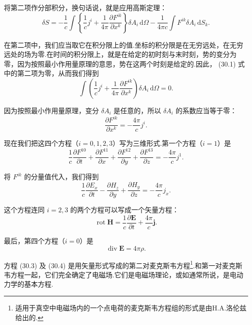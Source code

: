 将第二项作分部积分，换句话说，就是应用高斯定理：
\begin{equation}
  \delta S=-\frac{1}{c}\int\left\{\frac{1}{c}j^i
  +\frac{1}{4\pi}\frac{\partial F^{ik}}{\partial x^k}\right\}\delta A_i\,\mathrm{d}\varOmega
  -\frac{1}{4\pi c}\int F^{ik}\delta A_i\,\mathrm{d}S_k.
\end{equation}

在第二项中，我们应当取它在积分限上的值.坐标的积分限是在无穷远处，在无穷远处的场为零.在时间的积分限上，就是在给定的初时刻与末时刻，势的变分为零，因为按照最小作用量原理的意思，势在这两个时刻是给定的.因此，
(30.1) 式中的第二项为零，从而我们得到
\begin{equation*}
  \int\left(\frac{1}{c}j^i
  +\frac{1}{4\pi}\frac{\partial F^{ik}}{\partial x^k}\right)
  \delta A_i\,\mathrm{d}\varOmega=0.
\end{equation*}

因为按照最小作用量原理，变分 $\delta A_i$ 是任意的，所以 $\delta A_i$ 的系数应当等于零：
\begin{equation}
  \frac{\partial F^{ik}}{\partial x^k}=-\frac{4\pi}{c}j^i.
\end{equation}

现在我们把这四个方程（$i=0,1,2,3$）写为三维形式.第一个方程（$i=1$）是
\begin{equation*}
  \frac{1}{c}\frac{\partial F^{10}}{\partial t}
  +\frac{\partial F^{11}}{\partial x}
  +\frac{\partial F^{12}}{\partial y}
  +\frac{\partial F^{13}}{\partial z}=-\frac{4\pi}{c}j^1.
\end{equation*}

将 $F^{ik}$ 的分量值代入，我们得到
\begin{equation*}
  \frac{1}{c}\frac{\partial E_x}{\partial t}
  -\frac{\partial H_z}{\partial y}
  +\frac{\partial H_y}{\partial z}=-\frac{4\pi}{c}j_x.
\end{equation*}

这个方程连同 $i=2,3$ 的两个方程可以写成一个矢量方程：
\begin{equation}
  \operatorname{rot}\boldsymbol{H}
  =\frac{1}{c}\frac{\partial\boldsymbol{E}}{\partial t}
  +\frac{4\pi}{c}\boldsymbol{j}.
\end{equation}

最后，第四个方程（$i=0$）是
\begin{equation}
  \operatorname{div}\boldsymbol{E}=4\pi\rho.
\end{equation}

方程 (30.3) 及 (30.4)
是用矢量形式写成的第二对麦克斯韦方程\footnote{适用于真空中电磁场内的一个点电荷的麦克斯韦方程组的形式是由H.A.洛伦兹给出的.}.和第一对麦克斯韦方程一起，它们完全确定了电磁场.它们是电磁场理论，或如通常所说，是电动力学的基本方程.


